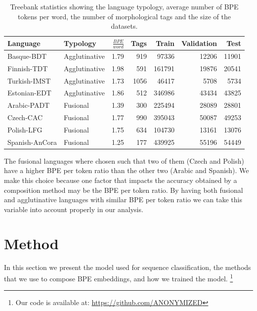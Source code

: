 \documentclass[11pt]{article}
\newcommand\jp[1]{(\textbf{JP:} #1)}
\begin{document}
    
    
    	\begin{table} %
		\centering
		\begin{tabular}{l|lrrrrr}
			Language & Typology & $\frac{BPE}{word}$ & Tags & Train & Validation & Test \\
			\hline
			Basque-BDT      & Agglutinative & 1.79 & 919 & 97336 & 12206 & 11901 \\
			Finnish-TDT     & Agglutinative & 1.98 & 591 & 161791 & 19876 & 20541 \\
			Turkish-IMST    & Agglutinative & 1.73 & 1056 & 46417 & 5708 & 5734 \\
			Estonian-EDT    & Agglutinative & 1.86 & 512 & 346986 & 43434 & 43825 \\
            Arabic-PADT     & Fusional & 1.39 & 300 & 225494 & 28089 & 28801  \\
			Czech-CAC       & Fusional & 1.77 & 990 & 395043 & 50087 & 49253 \\
			Polish-LFG      & Fusional & 1.75 & 634 & 104730 & 13161 & 13076 \\
			Spanish-AnCora  & Fusional & 1.25 & 177 & 439925 & 55196 & 54449 \\
        \end{tabular}
		\caption{\label{tab:data} Treebank statistics showing the language typology, average number of BPE tokens per word, the number of morphological tags and the size of the datasets.}
	\end{table}
    
        The fusional languages where chosen such that two of them
        (Czech and Polish) have a higher BPE per token ratio than the
        other two (Arabic and Spanish). We make this choice because
        one factor that impacts the accuracy obtained by a composition
        method may be the BPE per token ratio.  By having both
        fusional and agglutinative languages with similar BPE per
        token ratio we can take this variable into account properly in
        our analysis.

	\section{Method}
	\label{method}
    	In this section we present the model used for sequence
     classification, the methods that we use to compose BPE
     embeddings, and how we trained the model. \footnote{Our code is
     available at: \url{https://github.com/ANONYMIZED}}
\end{document}
